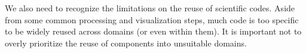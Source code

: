 We also need to recognize the limitations on the reuse of scientific
codes. Aside from some common processing and visualization steps, much
code is too specific to be widely reused across domains (or even
within them). It is important not to overly prioritize the reuse of
components into unsuitable domains.  

